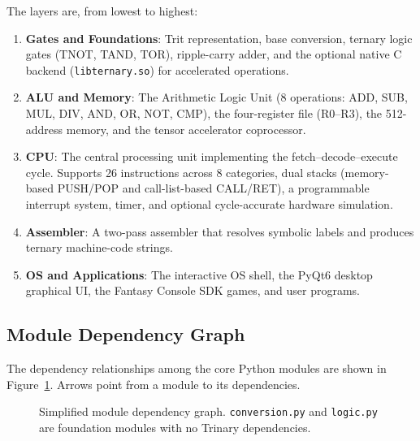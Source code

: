 \noindent The layers are, from lowest to highest:

\begin{enumerate}
    \item \textbf{Gates and Foundations}: Trit representation, base conversion, ternary logic gates (TNOT, TAND, TOR), ripple-carry adder, and the optional native C backend (\texttt{libternary.so}) for accelerated operations.
    \item \textbf{ALU and Memory}: The Arithmetic Logic Unit (8 operations: ADD, SUB, MUL, DIV, AND, OR, NOT, CMP), the four-register file (R0--R3), the 512-address memory, and the tensor accelerator coprocessor.
    \item \textbf{CPU}: The central processing unit implementing the fetch--decode--execute cycle. Supports 26 instructions across 8 categories, dual stacks (memory-based PUSH/POP and call-list-based CALL/RET), a programmable interrupt system, timer, and optional cycle-accurate hardware simulation.
    \item \textbf{Assembler}: A two-pass assembler that resolves symbolic labels and produces ternary machine-code strings.
    \item \textbf{OS and Applications}: The interactive OS shell, the PyQt6 desktop graphical UI, the Fantasy Console SDK games, and user programs.
\end{enumerate}

\subsection{Module Dependency Graph}

The dependency relationships among the core Python modules are shown in Figure~\ref{fig:deps}. Arrows point from a module to its dependencies.

\begin{figure}[h]
\centering
{}
\caption{Simplified module dependency graph. \texttt{conversion.py} and \texttt{logic.py} are foundation modules with no Trinary dependencies.}
\label{fig:deps}
\end{figure}

